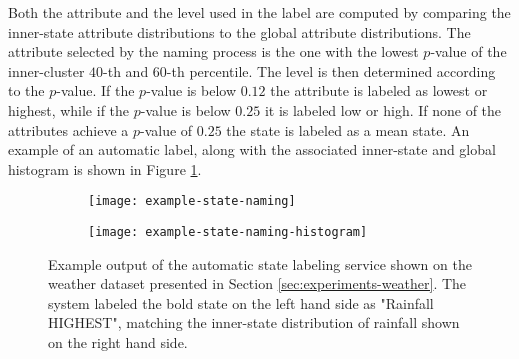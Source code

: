 Both the attribute and the level used in the label are computed by comparing the inner-state attribute
distributions to the global attribute distributions. The attribute selected by the naming process is
the one with the lowest $p$-value of the inner-cluster $40$-th and $60$-th percentile. The level is
then determined according to the $p$-value. If the $p$-value is below $0.12$ the attribute is labeled
as lowest or highest, while if the $p$-value is below $0.25$ it is labeled low or high. If none of the
attributes achieve a $p$-value of $0.25$ the state is labeled as a mean state. An example of an automatic
label, along with the associated inner-state and global histogram is shown in Figure \ref{fig:example-naming}.

\begin{figure}[h!]
	\centering
	\begin{subfigure}{.48\columnwidth}
	  	\centering
	  	\texttt{[image: example-state-naming]}
	\end{subfigure}
	\begin{subfigure}{.48\columnwidth}
	  	\centering
	  	\texttt{[image: example-state-naming-histogram]}
	\end{subfigure}
	\caption{Example output of the automatic state labeling service shown on the weather dataset presented in Section \ref{sec:experiments-weather}. The system labeled the bold state on the left hand side as "Rainfall HIGHEST", matching the inner-state distribution of rainfall shown on the right hand side.}
	\label{fig:example-naming}
\end{figure}

\iffalse
In order to assist the user in identifying the meaning of states, the system provides automatic default
state names, based on the distribution of attributes in the state. Each state is given a default name
by combining its most outstanding attribute with a discrete level: LOWEST, LOW, HIGH or
HIGHEST.

The attribute and the level are chosen by comparing its distribution inside the state to the global
distribution in all the states through histograms. This is achieved by first computing the percentiles
of the global distribution. The $40^{th}$ percentile is then computed for the state distribution and
compared against the global distribution. If this percentile lies below the $25^{th}$ or $12^{th}$
percentile, the state is marked with LOW or LOWEST respectively. The final name is chosen according
to the attribute which lies in the lowest percentile.
\fi

